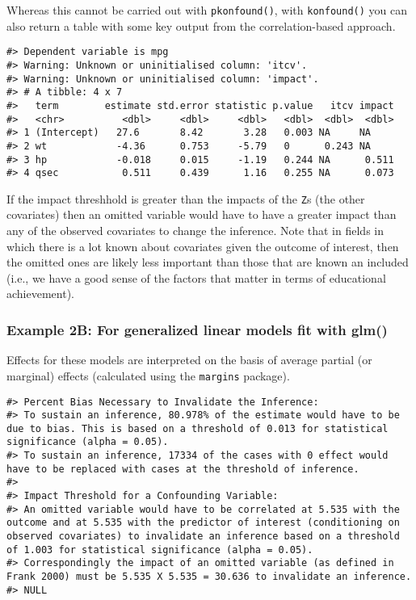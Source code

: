 \documentclass[man]{apa6}
\begin{document}
Whereas this cannot be carried out with \texttt{pkonfound()}, with
\texttt{konfound()} you can also return a table with some key output
from the correlation-based approach.

\begin{verbatim}
#> Dependent variable is mpg
#> Warning: Unknown or uninitialised column: 'itcv'.
#> Warning: Unknown or uninitialised column: 'impact'.
#> # A tibble: 4 x 7
#>   term        estimate std.error statistic p.value   itcv impact
#>   <chr>          <dbl>     <dbl>     <dbl>   <dbl>  <dbl>  <dbl>
#> 1 (Intercept)   27.6       8.42       3.28   0.003 NA     NA    
#> 2 wt            -4.36      0.753     -5.79   0      0.243 NA    
#> 3 hp            -0.018     0.015     -1.19   0.244 NA      0.511
#> 4 qsec           0.511     0.439      1.16   0.255 NA      0.073
\end{verbatim}

If the impact threshhold is greater than the impacts of the \texttt{Z}s
(the other covariates) then an omitted variable would have to have a
greater impact than any of the observed covariates to change the
inference. Note that in fields in which there is a lot known about
covariates given the outcome of interest, then the omitted ones are
likely less important than those that are known an included (i.e., we
have a good sense of the factors that matter in terms of educational
achievement).

\subsubsection{Example 2B: For generalized linear models fit with
glm()}\label{example-2b-for-generalized-linear-models-fit-with-glm}

Effects for these models are interpreted on the basis of average partial
(or marginal) effects (calculated using the \texttt{margins} package).

\begin{verbatim}
#> Percent Bias Necessary to Invalidate the Inference:
#> To sustain an inference, 80.978% of the estimate would have to be due to bias. This is based on a threshold of 0.013 for statistical significance (alpha = 0.05).
#> To sustain an inference, 17334 of the cases with 0 effect would have to be replaced with cases at the threshold of inference.
#> 
#> Impact Threshold for a Confounding Variable:
#> An omitted variable would have to be correlated at 5.535 with the outcome and at 5.535 with the predictor of interest (conditioning on observed covariates) to invalidate an inference based on a threshold of 1.003 for statistical significance (alpha = 0.05).
#> Correspondingly the impact of an omitted variable (as defined in Frank 2000) must be 5.535 X 5.535 = 30.636 to invalidate an inference.
#> NULL
\end{verbatim}
\end{document}
